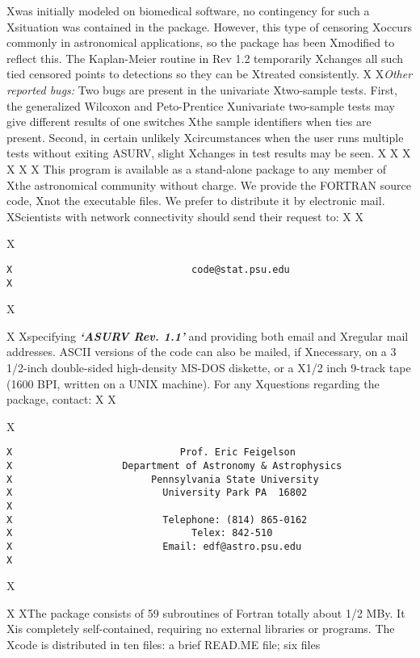 Xwas initially modeled on biomedical software, no contingency for such a
Xsituation was contained in the package.  However, this type of censoring
Xoccurs commonly in astronomical applications, so the package has been 
Xmodified to reflect this.  The Kaplan-Meier routine in Rev 1.2 temporarily 
Xchanges all such tied censored points to detections so they can be 
Xtreated consistently.
X
X{\it Other reported bugs:}  Two bugs are present in the univariate
Xtwo-sample tests.  First, the generalized Wilcoxon and Peto-Prentice 
Xunivariate two-sample tests may give different results of one switches 
Xthe sample identifiers when ties are present.  Second, in certain unlikely 
Xcircumstances when the user runs multiple tests without exiting ASURV, slight 
Xchanges in test results may be seen.  
X
X\bigskip
X
X
X 
X     This program is available as a stand-alone package  to any member of 
Xthe astronomical community without charge.  We provide the FORTRAN source code,
Xnot the executable files. We prefer to distribute it by electronic mail.  
XScientists with network connectivity should send their request to:
X
X\begin{center}
X\begin{verbatim}
X                               code@stat.psu.edu
X\end{verbatim}
X\end{center}
X
X\noindent specifying {\sl\bf `ASURV Rev. 1.1'} and providing both email and 
Xregular mail addresses.   ASCII versions of the code can also be mailed, if 
Xnecessary,  on a 3 1/2-inch double-sided high-density MS-DOS diskette, or a
X1/2 inch 9-track tape (1600 BPI, written on a UNIX machine).  For any 
Xquestions regarding the package, contact:
X
X\begin{center}
X\begin{verbatim}
X                             Prof. Eric Feigelson 
X                   Department of Astronomy & Astrophysics
X                        Pennsylvania State University 
X                          University Park PA  16802
X
X                          Telephone: (814) 865-0162 
X                               Telex: 842-510  
X                          Email: edf@astro.psu.edu
X\end{verbatim}
X\end{center}
X
XThe package consists of 59 subroutines of Fortran totally about 1/2 MBy. It
Xis completely self-contained, requiring no external libraries or programs.  The
Xcode is distributed in ten files: a brief READ.ME file; six files 
